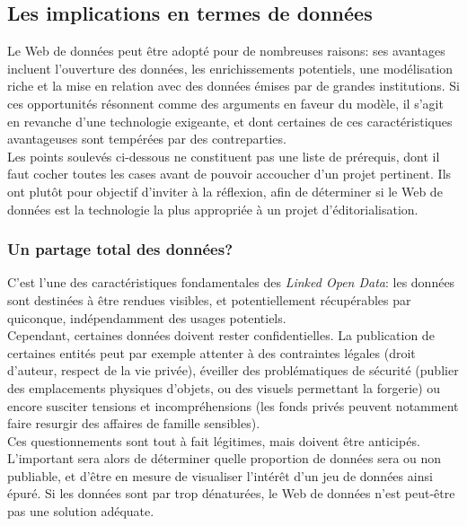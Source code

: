 \documentclass[a4paper,12pt,twoside]{book}
\begin{document}
\subsection{Les implications en termes de données}

Le Web de données peut être adopté pour de nombreuses raisons: ses avantages incluent l'ouverture des données, les enrichissements potentiels, une modélisation riche et la mise en relation avec des données émises par de grandes institutions. Si ces opportunités résonnent comme des arguments en faveur du modèle, il s'agit en revanche d'une technologie exigeante, et dont certaines de ces caractéristiques avantageuses sont tempérées par des contreparties.\\

Les points soulevés ci-dessous ne constituent pas une liste de prérequis, dont il faut cocher toutes les cases avant de pouvoir accoucher d'un projet pertinent. Ils ont plutôt pour objectif d'inviter à la réflexion, afin de déterminer si le Web de données est la technologie la plus appropriée à un projet d'éditorialisation. 



\subsubsection{Un partage total des données?}\label{3-confidentialite}
C'est l'une des caractéristiques fondamentales des \textit{Linked Open Data}: les données sont destinées à être rendues visibles, et potentiellement récupérables par quiconque, indépendamment des usages potentiels.\\

Cependant, certaines données doivent rester confidentielles. La publication de certaines entités peut par exemple attenter à des contraintes légales (droit d'auteur, respect de la vie privée), éveiller des problématiques de sécurité (publier des emplacements physiques d'objets, ou des visuels permettant la forgerie) ou encore susciter tensions et incompréhensions (les fonds privés peuvent notamment faire resurgir des \og affaires de famille \fg{} sensibles).\\

Ces questionnements sont tout à fait légitimes, mais doivent être anticipés. L'important sera alors de déterminer quelle proportion de données sera ou non publiable, et d'être en mesure de visualiser l'intérêt d'un jeu de données ainsi épuré. Si les données sont par trop dénaturées, le Web de données n'est peut-être pas une solution adéquate.
\end{document}
